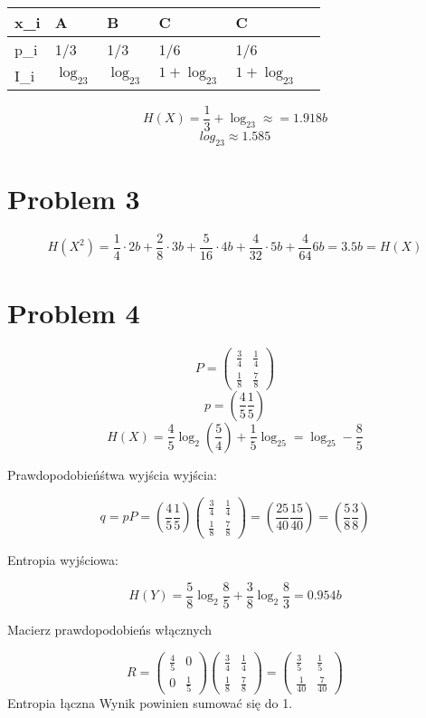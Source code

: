 \documentclass[12pt]{article}
\begin{document}
\begin{table}[h]
\begin{tabular}{|l|l|l|l|l|l|}
\hline
x\_i & A   & B   & C   & C   \\ \hline
p\_i & 1/3 & 1/3 & 1/6 & 1/6 \\ \hline
I\_i & $\log_23$  & $\log_23$  & $1+\log_23$  & $1+\log_23$  \\ \hline
\end{tabular}

\end{table}

$$ H(X) = \frac{1}{3} + \log_23 \approx = 1.918b $$
$$log_23 \approx 1.585 $$

\section*{Problem 3}

$$H(X^2) = \frac{1}{4}\cdot 2b+\frac{2}{8}\cdot 3b + \frac{5}{16}\cdot 4b + \frac{4}{32} \cdot 5b + 
\frac{4}{64} 6b =3.5b = H(X)  $$

\section*{Problem 4}
$$P= 
\begin{pmatrix}
    \frac{3}{4} & \frac{1}{4} \\
    \frac{1}{8} & \frac{7}{8} 
\end{pmatrix}
$$
$$p=\left( \frac{4}{5} \frac{1}{5}  \right) $$
$$H(X) = \frac{4}{5}\log_2(\frac{5}{4}) + \frac{1}{5} \log_25 = \log_25 - \frac{8}{5}  $$

Prawdopodobieńśtwa wyjścia wyjścia:

$$q = pP = (\frac{4}{5} \frac{1}{5} )   
\begin{pmatrix}
    \frac{3}{4} & \frac{1}{4} \\
    \frac{1}{8} & \frac{7}{8} 
\end{pmatrix}
= \left( \frac{25}{40} \frac{15}{40}  \right) 
= \left( \frac{5}{8} \frac{3}{8}  \right) 
$$

Entropia wyjściowa:

$$H(Y) = \frac{5}{8}\log_2\frac{8}{5} + \frac{3}{8}\log_2\frac{8}{3} = 0.954b $$

Macierz prawdopodobieńs włącznych 

$$ R =
\begin{pmatrix}
    \frac{4}{5} & 0 \\
    0 & \frac{1}{5} 
\end{pmatrix}
\begin{pmatrix}
    \frac{3}{4} & \frac{1}{4} \\
    \frac{1}{8} & \frac{7}{8} 
\end{pmatrix}=
\begin{pmatrix}
    \frac{3}{5} & \frac{1}{5} \\
    \frac{1}{40} & \frac{7}{40} 
\end{pmatrix}
$$
Entropia łączna
Wynik powinien sumować się do 1. 
\end{document}
